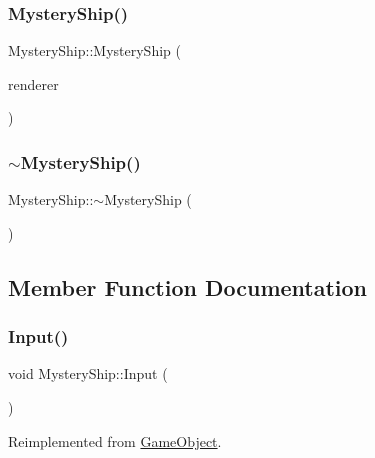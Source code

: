 \subsubsection{\texorpdfstring{Mystery\+Ship()}{MysteryShip()}}
{\footnotesize\ttfamily Mystery\+Ship\+::\+Mystery\+Ship (\begin{DoxyParamCaption}\item[{S\+D\+L\+\_\+\+Renderer $\ast$}]{renderer }\end{DoxyParamCaption})}

\mbox{\label{class_mystery_ship_a4396e9190999aa5b2879b4886d11814c}} 
\subsubsection{\texorpdfstring{$\sim$\+Mystery\+Ship()}{~MysteryShip()}}
{\footnotesize\ttfamily Mystery\+Ship\+::$\sim$\+Mystery\+Ship (\begin{DoxyParamCaption}{ }\end{DoxyParamCaption})}



\subsection{Member Function Documentation}
\mbox{\label{class_mystery_ship_ad79eee772a091f9ea2b194744450e5f2}} 
\subsubsection{\texorpdfstring{Input()}{Input()}}
{\footnotesize\ttfamily void Mystery\+Ship\+::\+Input (\begin{DoxyParamCaption}{ }\end{DoxyParamCaption})\hspace{0.3cm}{\ttfamily [virtual]}}



Reimplemented from \mbox{\hyperlink{class_game_object_a430742cf91abb99337c556c88bef880a}{Game\+Object}}.

\mbox{\label{class_mystery_ship_ace0406106086ab58d8da318e902ade0a}} 
